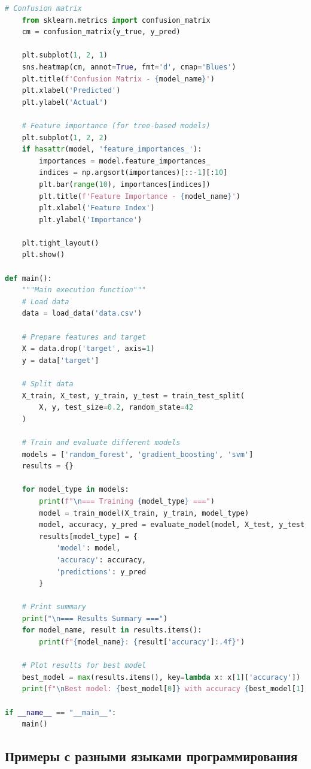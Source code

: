 \begin{lstlisting}[style=code, language=Python, caption={Пример алгоритма машинного обучения с улучшенной подсветкой}, label={lst:ml_algorithm_enhanced}]
    # Confusion matrix
    from sklearn.metrics import confusion_matrix
    cm = confusion_matrix(y_true, y_pred)
    
    plt.subplot(1, 2, 1)
    sns.heatmap(cm, annot=True, fmt='d', cmap='Blues')
    plt.title(f'Confusion Matrix - {model_name}')
    plt.xlabel('Predicted')
    plt.ylabel('Actual')
    
    # Feature importance (for tree-based models)
    plt.subplot(1, 2, 2)
    if hasattr(model, 'feature_importances_'):
        importances = model.feature_importances_
        indices = np.argsort(importances)[::-1][:10]
        plt.bar(range(10), importances[indices])
        plt.title(f'Feature Importance - {model_name}')
        plt.xlabel('Feature Index')
        plt.ylabel('Importance')
    
    plt.tight_layout()
    plt.show()

def main():
    """Main execution function"""
    # Load data
    data = load_data('data.csv')
    
    # Prepare features and target
    X = data.drop('target', axis=1)
    y = data['target']
    
    # Split data
    X_train, X_test, y_train, y_test = train_test_split(
        X, y, test_size=0.2, random_state=42
    )
    
    # Train and evaluate different models
    models = ['random_forest', 'gradient_boosting', 'svm']
    results = {}
    
    for model_type in models:
        print(f"\n=== Training {model_type} ===")
        model = train_model(X_train, y_train, model_type)
        model, accuracy, y_pred = evaluate_model(model, X_test, y_test, model_type)
        results[model_type] = {
            'model': model,
            'accuracy': accuracy,
            'predictions': y_pred
        }
    
    # Print summary
    print("\n=== Results Summary ===")
    for model_name, result in results.items():
        print(f"{model_name}: {result['accuracy']:.4f}")
    
    # Plot results for best model
    best_model = max(results.items(), key=lambda x: x[1]['accuracy'])
    print(f"\nBest model: {best_model[0]} with accuracy {best_model[1]['accuracy']:.4f}")

if __name__ == "__main__":
    main()
\end{lstlisting}

\subsection{Примеры с разными языками программирования}

